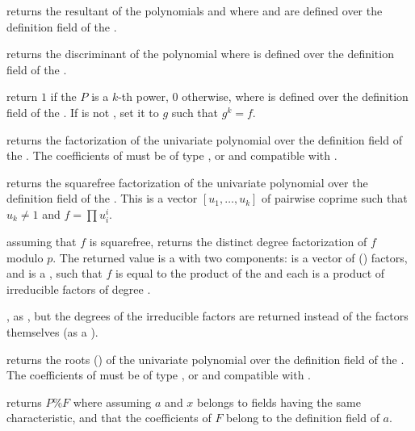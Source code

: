  returns the resultant of the polynomials
 and  where  and  are defined over the definition
field of the  .

 returns the discriminant of the polynomial
 where  is defined over the definition field of the 
.

return $1$ if the  $P$ is a $k$-th power, $0$ otherwise,
where  is defined over the definition field of the  .
If  is not , set it to $g$ such that $g^k = f$.

 returns the factorization of the univariate
polynomial  over the definition field of the  . The
coefficients of  must be of type ,  or 
and compatible with .

 returns the squarefree
factorization of the univariate polynomial  over the definition field of
the  .  This is a vector $[u_1,\dots,u_k]$ of pairwise
coprime  such that $u_k \neq 1$ and $f = \prod u_i^i$.

 assuming that $f$ is squarefree,
returns the distinct degree factorization of $f$ modulo $p$.
The returned value  is a  with two
components:  is a vector of ()
factors, and  is a , such that
$f$ is equal to the product of the  and each 
is a product of irreducible factors of degree .

, as , but the
degrees of the irreducible factors are returned instead of the factors
themselves (as a ).

 returns the roots ()
of the univariate polynomial  over the definition field of the
 . The coefficients of  must be of type ,
 or  and compatible with .

 returns $P\%F$
where  assuming $a$ and $x$ belongs to fields having the same
characteristic, and that the coefficients of $F$ belong to the definition
field of $a$.

